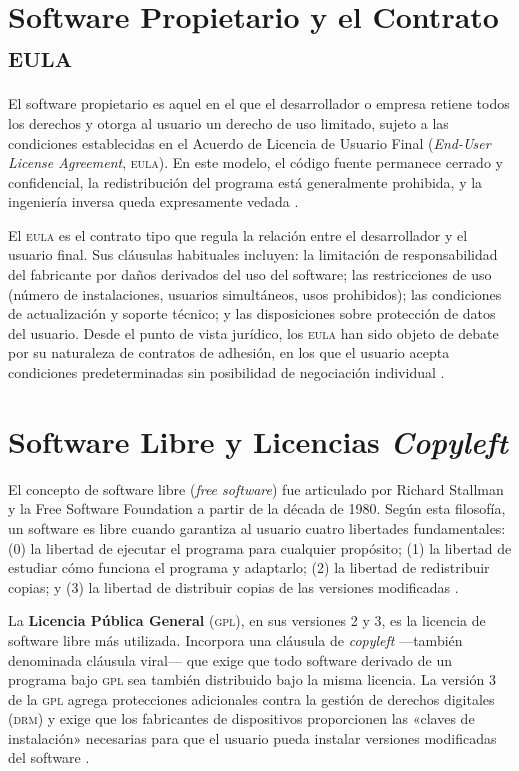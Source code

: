\documentclass[11pt,a4paper]{report}
\begin{document}
\section{Software Propietario y el Contrato \textsc{eula}}

El software propietario es aquel en el que el desarrollador o empresa retiene todos los derechos y otorga al usuario un derecho de uso limitado, sujeto a las condiciones establecidas en el Acuerdo de Licencia de Usuario Final (\textit{End-User License Agreement}, \textsc{eula}). En este modelo, el código fuente permanece cerrado y confidencial, la redistribución del programa está generalmente prohibida, y la ingeniería inversa queda expresamente vedada \citep{euipo2022}.

El \textsc{eula} es el contrato tipo que regula la relación entre el desarrollador y el usuario final. Sus cláusulas habituales incluyen: la limitación de responsabilidad del fabricante por daños derivados del uso del software; las restricciones de uso (número de instalaciones, usuarios simultáneos, usos prohibidos); las condiciones de actualización y soporte técnico; y las disposiciones sobre protección de datos del usuario. Desde el punto de vista jurídico, los \textsc{eula} han sido objeto de debate por su naturaleza de contratos de adhesión, en los que el usuario acepta condiciones predeterminadas sin posibilidad de negociación individual \citep{ompi2024}.

\section{Software Libre y Licencias \textit{Copyleft}}

El concepto de software libre (\textit{free software}) fue articulado por Richard Stallman y la Free Software Foundation a partir de la década de 1980. Según esta filosofía, un software es libre cuando garantiza al usuario cuatro libertades fundamentales: (0) la libertad de ejecutar el programa para cualquier propósito; (1) la libertad de estudiar cómo funciona el programa y adaptarlo; (2) la libertad de redistribuir copias; y (3) la libertad de distribuir copias de las versiones modificadas \citep{euipo2022}.

La \textbf{Licencia Pública General} (\textsc{gpl}), en sus versiones 2 y 3, es la licencia de software libre más utilizada. Incorpora una cláusula de \textit{copyleft} —también denominada cláusula viral— que exige que todo software derivado de un programa bajo \textsc{gpl} sea también distribuido bajo la misma licencia. La versión 3 de la \textsc{gpl} agrega protecciones adicionales contra la gestión de derechos digitales (\textsc{drm}) y exige que los fabricantes de dispositivos proporcionen las «claves de instalación» necesarias para que el usuario pueda instalar versiones modificadas del software \citep{ompi2024}.
\end{document}
